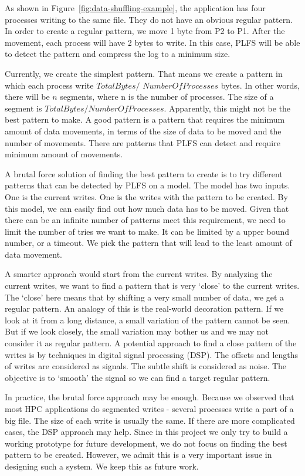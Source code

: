 \documentclass{acm_proc_article-sp}
\begin{document}
As shown in Figure~\ref{fig:data-shuffling-example},
the application has four processes writing to 
the same file. They do not have an obvious regular
pattern. In order to create a regular pattern,
we move 1 byte from P2 to P1. After the movement, 
each process will have 2 bytes to write. In this
case, PLFS will be able to detect the pattern
and compress the log to a minimum size.

Currently, we create the simplest pattern.
That means we create a pattern in which
each process write $TotalBytes/$ $NumberOfProcesses$ bytes.
In other words, there will be $n$ segments,
where n is the number of processes. 
The size of a segment is $TotalBytes/NumberOfProcesses$.
Apparently, this might not be the best pattern to make.
A good pattern is a pattern that requires
the minimum amount of data movements, in terms
of the size of data to be moved and the number
of movements. There are patterns that 
PLFS can detect and require minimum amount
of movements.

A brutal force solution of finding the best
pattern to create is to try different patterns
that can be detected by PLFS on a model.
The model has two inputs. One is the current
writes. One is the writes with the pattern
to be created. By this model, we can easily
find out how much data has to be moved.
Given that
there can be an infinite number of patterns
meet this requirement, we need to limit
the number of tries we want to make. It
can be limited by a upper bound number, or 
a timeout. We pick the pattern that will
lead to the least amount of data movement.

A smarter approach would start from
the current writes. By analyzing the 
current writes, we want to find a pattern
that is very `close' to the current writes.
The `close' here means that by shifting
a very small number of data, we get a 
regular pattern. An analogy of this is
the real-world decoration pattern. If
we look at it from a long distance, 
a small variation of the pattern
cannot be seen. But if we look closely,
the small variation may bother us
and we may not consider it as regular 
pattern. A potential approach to 
find a close pattern of the writes
is by techniques in digital signal processing (DSP).
The offsets and lengths of writes are 
considered as signals.
The subtle shift is considered as noise.
The objective is to `smooth' the signal
so we can find a target regular pattern.

In practice, the brutal force approach
may be enough. Because we observed that 
most HPC applications do segmented writes
- several processes write a part of a big
file. The size of each write is usually
the same. If there are more complicated
cases, the DSP approach may help. 
Since in this project we only try to build
a working prototype for future development,
we do not focus on finding the best pattern
to be created. However, we admit this is
a very important issue in designing such a
system. We keep this as future work.
\end{document}
